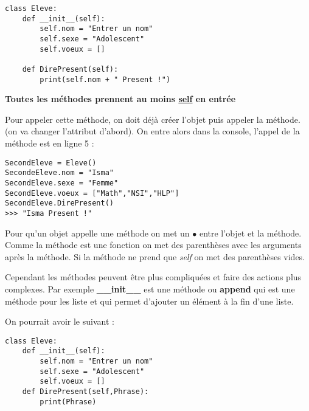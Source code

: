 \documentclass[12pt,fleqn]{report} %
\begin{document}
\begin{center}
	\begin{varwidth}[t]{.5\textwidth}
		\begin{lstlisting}[language=iPython,linewidth = 12cm]
class Eleve:
	def __init__(self):
		self.nom = "Entrer un nom"
		self.sexe = "Adolescent"
		self.voeux = []
	
	def DirePresent(self):
		print(self.nom + " Present !") \end{lstlisting}
\end{varwidth}\end{center}

\begin{remark}
	\textbf{Toutes les méthodes prennent au moins \underline{self} en entrée}
\end{remark}

Pour appeler cette méthode, on doit déjà créer l'objet puis appeler la méthode. (on va changer l'attribut d'abord). On entre alors dans la console, l'appel de la méthode est en ligne 5 : 
\begin{center}
	\begin{varwidth}[t]{.5\textwidth}
		\begin{lstlisting}[language=iPython,linewidth = 12cm]
SecondEleve = Eleve()
SecondeEleve.nom = "Isma"
SecondEleve.sexe = "Femme"
SecondEleve.voeux = ["Math","NSI","HLP"]
SecondEleve.DirePresent()
>>> "Isma Present !"\end{lstlisting}
\end{varwidth}\end{center}

\begin{remark}
	Pour qu'un objet appelle une méthode on met un $\bullet$ entre l'objet et la méthode. Comme la méthode est une fonction on met des parenthèses avec les arguments après la méthode. Si la méthode ne prend que \textit{self} on met des parenthèses vides.
\end{remark}

Cependant les méthodes peuvent être plus compliquées et faire des actions plus complexes. Par exemple \textbf{\_\_init\_\_} est une méthode ou \textbf{append} qui est une méthode pour les liste et qui permet d'ajouter un élément à la fin d'une liste.

On pourrait avoir le suivant :  \\

\begin{center}
	\begin{varwidth}[t]{.5\textwidth}
\begin{lstlisting}[language=iPython,linewidth = 12cm]
class Eleve:
	def __init__(self):
		self.nom = "Entrer un nom"
		self.sexe = "Adolescent"
		self.voeux = []
	def DirePresent(self,Phrase):
		print(Phrase) \end{lstlisting}
\end{varwidth}\end{center}
\end{document}
